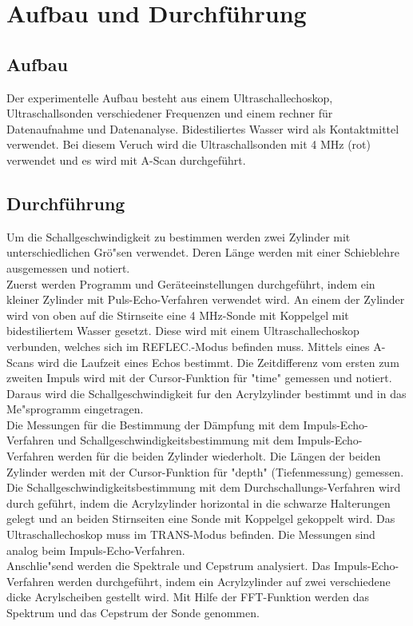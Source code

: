 \section{ Aufbau und Durchführung}
\subsection{Aufbau}
Der experimentelle Aufbau besteht aus einem Ultraschallechoskop, Ultraschallsonden verschiedener Frequenzen und einem rechner für Datenaufnahme und Datenanalyse.  Bidestiliertes Wasser wird als Kontaktmittel verwendet.
Bei diesem Veruch wird die Ultraschallsonden mit 4 MHz (rot) verwendet und es wird mit A-Scan durchgeführt.  
\subsection{Durchführung}
Um die Schallgeschwindigkeit zu bestimmen werden zwei Zylinder mit unterschiedlichen Grö"sen verwendet. Deren Länge werden mit einer Schieblehre
ausgemessen und notiert.\\ 
Zuerst werden Programm und Geräteeinstellungen durchgeführt, indem ein kleiner Zylinder mit Puls-Echo-Verfahren verwendet wird.
An einem der Zylinder wird von oben auf die Stirnseite eine 4 MHz-Sonde mit Koppelgel mit bidestiliertem Wasser gesetzt. Diese wird
mit einem Ultraschallechoskop verbunden, welches sich im REFLEC.-Modus  befinden muss. Mittels eines
A-Scans wird die Laufzeit eines Echos bestimmt. Die Zeitdifferenz vom ersten zum zweiten Impuls wird mit der Cursor-Funktion für "time" gemessen und notiert. 
Daraus wird die Schallgeschwindigkeit fur den Acrylzylinder bestimmt und in das Me"sprogramm eingetragen.\\
Die Messungen für die Bestimmung der Dämpfung mit dem Impuls-Echo-Verfahren und Schallgeschwindigkeitsbestimmung mit dem Impuls-Echo-Verfahren werden für die beiden Zylinder wiederholt.
Die Längen der beiden Zylinder werden mit der Cursor-Funktion für "depth" (Tiefenmessung) gemessen.\\
Die Schallgeschwindigkeitsbestimmung mit dem Durchschallungs-Verfahren wird durch geführt, indem die  Acrylzylinder horizontal in die schwarze Halterungen  gelegt und an beiden Stirnseiten eine Sonde mit Koppelgel gekoppelt wird. 
Das Ultraschallechoskop muss im TRANS-Modus befinden. Die Messungen sind analog beim Impuls-Echo-Verfahren.\\
Anschlie"send werden die Spektrale und Cepstrum analysiert. Das Impuls-Echo-Verfahren werden durchgeführt, indem ein  Acrylzylinder auf zwei verschiedene dicke Acrylscheiben gestellt wird.
 Mit Hilfe der FFT-Funktion werden das Spektrum und das Cepstrum der Sonde genommen.

\label{sec:Durchführung}
